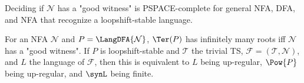 \documentclass[a4paper,USenglish,cleveref,autoref,thm-restate]{lipics-v2021}
\newcommand{\mc}[1]{\ensuremath{\mathcal{#1}}}
\newcommand{\T}{\mc{T}}
\newcommand{\F}{\mc{F}}
\newcommand{\N}{\mc{N}}
\newcommand{\PSPACE}{\textsf{PSPACE}\xspace}
\begin{document}
\iffalse
  \begin{corollary}
    Deciding if $\N$ has a "good witness" is \PSPACE-complete for general NFA, DFA, and NFA that recognize a loopshift-stable language.

    For an NFA $\N$ and $P = \LangDFA{\N}$, $\Ter(P)$ has infinitely many roots iff $\N$ has a "good witness".
    If $P$ is loopshift-stable and $\T$ the trivial TS, $\F = (\T,\N)$, and $L$ the language of $\F$, then this is equivalent to $L$ being up-regular, $\Pow{P}$ being up-regular, and $\synL$ being finite.
  \end{corollary}
\end{document}
